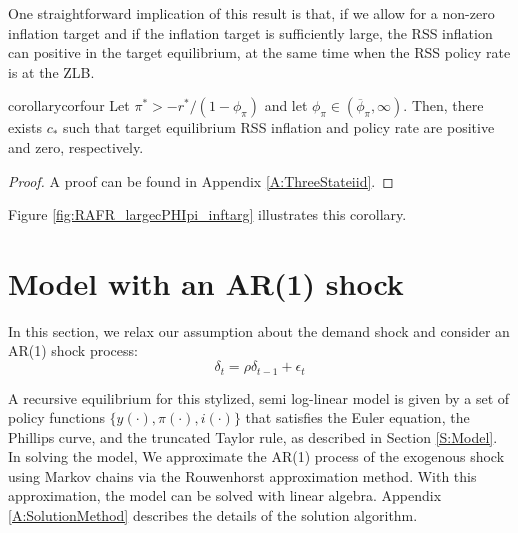 \documentclass[11pt]{article}
\begin{document}
	One straightforward implication of this result is that, if we allow for a non-zero inflation target and if the inflation target is sufficiently large, the RSS inflation can positive in the target equilibrium, at the same time when the RSS policy rate is at the ZLB.
	
	
	\begin{restatable}{corollary}{corfour}
		Let $\pi^*> -r^*/(1-\phi_{\pi})$  and let $\phi_{\pi}\in(\overline{\phi}_{\pi},\infty)$. Then, there exists $c_*$ such that target equilibrium RSS inflation and policy rate are positive and zero, respectively.
	\end{restatable}
	\begin{proof}
		A proof can be found in Appendix \ref{A:ThreeStateiid}.
	\end{proof}
	
	Figure \ref{fig:RAFR_largecPHIpi_inftarg} illustrates this corollary. 		
	
	
	\section{Model with an AR(1) shock}
	\label{S:ModelAR1}
	
	In this section, we relax our assumption about the demand shock and consider an AR(1) shock process: 
	\begin{equation}
	\delta_t = \rho \delta_{t-1} + \epsilon_{t}
	\end{equation}
	
	A recursive equilibrium for this stylized, semi log-linear model is given by a set of policy functions $\{y(\cdot), \pi(\cdot), i(\cdot)\}$ that satisfies the Euler equation, the Phillips curve, and the truncated Taylor rule, as described in Section \ref{S:Model}. In solving the model, We approximate the AR(1) process of the exogenous shock using Markov chains via the Rouwenhorst approximation method. With this approximation, the model can be solved with linear algebra. Appendix \ref{A:SolutionMethod} describes the details of the solution algorithm.
	
\end{document}

